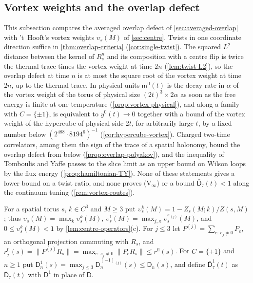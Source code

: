 \documentclass[11pt,a4paper]{amsart}
\theoremstyle{definition}
\theoremstyle{remark}
\numberwithin{equation}{section}
\newcommand{\norm}[1]{\lVert #1\rVert}     %
\newcommand{\Zpart}[2]{Z(#1,#2)}           %
\newcommand{\Mcirc}{\text{\upshape(M$^{\circ}$)}}   %
\begin{document}
\subsection{Vortex weights and the overlap defect}\label{sec:vortex-overlap}

This subsection compares the averaged overlap defect of \cref{sec:averaged-overlap} with 't~Hooft's vortex weights $\upsilon_s(M)$ of \cref{sec:centre}. Twists in one coordinate direction suffice in \cref{thm:overlap-criteria} (\cref{cor:single-twist}). The squared $L^2$ distance between the kernel of $R_s^n$ and its composition with a centre flip is twice the thermal trace times the vortex weight at time $2n$ (\cref{lem:twist-L2}), so the overlap defect at time $n$ is at most the square root of the vortex weight at time $2n$, up to the thermal trace. In physical units $\mathsf m^{\mathrm{fl}}(t)$ is the decay rate in $\alpha$ of the vortex weight of the torus of physical size $(2t)^3\times2\alpha$ as soon as the free energy is finite at one temperature (\cref{prop:vortex-physical}), and along a family with $C=\{\pm1\}$, \Mcirc{} is equivalent to $y^0(t)\to0$ together with a bound of the vortex weight of the hypercube of physical side $2t$, for arbitrarily large $t$, by a fixed number below $(2^{488}\cdot8194^6)^{-1}$ (\cref{cor:hypercube-vortex}). Charged two-time correlators, among them the sign of the trace of a spatial holonomy, bound the overlap defect from below (\cref{prop:overlap-polyakov}), and the inequality of Tomboulis and Yaffe passes to the slice limit as an upper bound on Wilson loops by the flux energy (\cref{prop:hamiltonian-TY}). None of these statements gives a lower bound on a twist ratio, and none proves \textup{(V$_\infty$)} or a bound $\bar{\mathsf D}_\tau(t)<1$ along the continuum tuning (\cref{rem:vortex-routes}).

For a spatial torus $s$, $k\in C^3$ and $M\ge3$ put $\upsilon^k_s(M)=1-Z_s(M;k)/\Zpart{s}{M}$; thus $\upsilon_s(M)=\max_k\upsilon^k_s(M)$, $\upsilon^1_s(M)=\max_{j,\kappa}\upsilon^{\kappa_{(j)}}_s(M)$, and $0\le\upsilon^k_s(M)<1$ by \cref{lem:centre-operators}\textup{(c)}. For $j\le3$ let $P^{(j)}=\sum_{e:\,e_j\ne0}P_e$, an orthogonal projection commuting with $R_s$, and $r^{\mathrm{fl}}_j(s)=\norm{P^{(j)}R_s}=\max_{e:\,e_j\ne0}\norm{P_eR_s}\le r^{\mathrm{fl}}(s)$. For $C=\{\pm1\}$ and $n\ge1$ put $\mathsf D^1_n(s)=\max_{j\le3}\mathsf D^{(-1)_{(j)}}_n(s)\le\mathsf D_n(s)$, and define $\bar{\mathsf D}^1_\tau(t)$ as $\bar{\mathsf D}_\tau(t)$ with $\mathsf D^1$ in place of $\mathsf D$.
\end{document}
